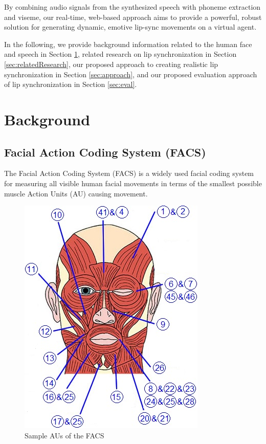 \documentclass[12pt]{article}
\begin{document}
By combining audio signals from the synthesized speech with phoneme extraction and viseme, our real-time, web-based approach aims to provide a powerful, robust solution for generating dynamic, emotive lip-sync movements on a virtual agent. 

In the following, we provide background information related to the human face and speech in Section \ref{sec:background}, related research on lip synchronization in Section \ref{sec:relatedResearch}, our proposed approach to creating realistic lip synchronization in Section \ref{sec:approach}, and our proposed evaluation approach of  lip synchronization in Section \ref{sec:eval}.
\newpage
\section{Background}
\label{sec:background}

\subsection{Facial Action Coding System (FACS)}
\label{sec:FACS}

The Facial Action Coding System (FACS) \cite{Ekman1976MeasuringMovement} is a widely
used facial coding system for measuring all visible human facial 
movements in terms of the smallest possible muscle Action
Units (AU) causing movement. 

\begin{figure}
    \centering
    \vspace{-5mm}
    \includegraphics[width=\linewidth]{FaceMuscles-AUs.jpg}
    \caption{Sample AUs of the FACS}
    \label{fig:facs}
\end{figure}
\end{document}
